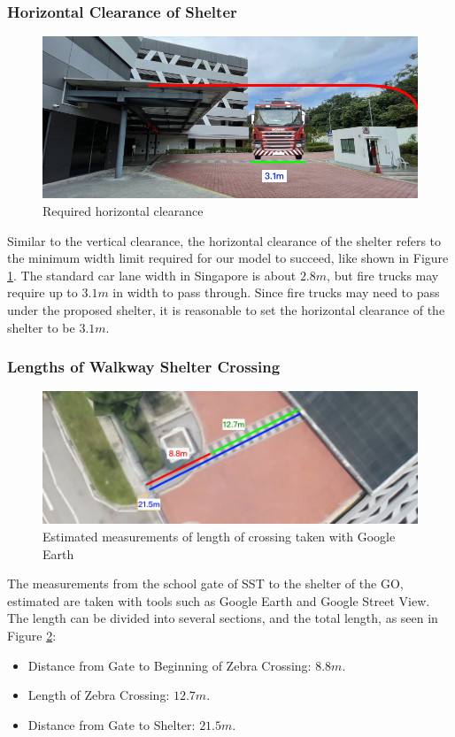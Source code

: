\documentclass[a4paper,titlepage]{article}
\begin{document}
\subsubsection{Horizontal Clearance of Shelter}
\begin{figure}[htbp]
    \centering
    \includegraphics[width=\textwidth]{horizontalClearance.png}
    \caption{Required horizontal clearance}
    \label{fig:horizontalClearance}
\end{figure}
Similar to the vertical clearance, the horizontal clearance of the shelter refers to the minimum width limit required for our model to succeed, like shown in Figure \ref{fig:horizontalClearance}. The standard car lane width in Singapore is about $2.8\si{m}$, but fire trucks may require up to $3.1\si{m}$ in width to pass through\cite{musingsofsgtransport-roadwidth}. Since fire trucks may need to pass under the proposed shelter, it is reasonable to set the horizontal clearance of the shelter to be $3.1\si{m}$.

\subsubsection{Lengths of Walkway Shelter Crossing}
\begin{figure}[htbp]
    \centering
    \includegraphics[width=\textwidth]{crossingLength.png}
    \caption{Estimated measurements of length of crossing taken with Google Earth}
    \label{fig:crossingLength}
\end{figure}
The measurements from the school gate of SST to the shelter of the GO, estimated are taken with tools such as Google Earth and Google Street View. The length can be divided into several sections, and the total length, as seen in Figure \ref{fig:crossingLength}:
\begin{itemize}
    \item Distance from Gate to Beginning of Zebra Crossing: $8.8\si{m}$.
    \item Length of Zebra Crossing: $12.7\si{m}$.
    \item Distance from Gate to Shelter: $21.5\si{m}$.
\end{itemize}
\end{document}

